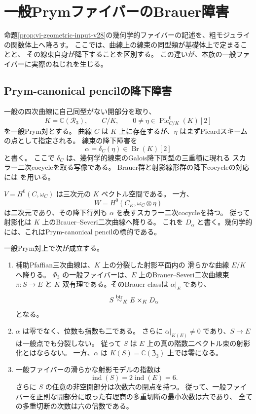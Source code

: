 \section{一般PrymファイバーのBrauer障害}
\label{sec:prym-brauer-v27}

命題\ref{prop:vi-geometric-input-v28}の幾何学的ファイバーの記述を、粗モジュライの関数体上へ降ろす。
ここでは、曲線上の線束の同型類が基礎体上で定まることと、
その線束自身が降下することを区別する。
この違いが、本族の一般ファイバーに実際のねじれを生じる。

\subsection{Prym-canonical pencilの降下障害}
一般の四次曲線に自己同型がない開部分を取り、
\[
 K=\mathbb C(\mathcal R_3),\qquad
 C/K,\qquad
 0\ne\eta\in\operatorname{Pic}^0_{C/K}(K)[2]
\]
を一般Prym対とする。
曲線 $C$ は $K$ 上に存在するが、$\eta$ はまずPicardスキームの点として指定される。
線束の降下障害を
\[
 \alpha=\delta_C(\eta)\in\operatorname{Br}(K)[2]
\]
と書く。
ここで $\delta_C$ は、幾何学的線束のGalois降下同型の三重積に現れる
スカラー二次cocycleを取る写像である。
Brauer群と射影線形群の降下cocycleの対応には
\cite[Tags 03R1, 0A2J]{StacksBrauerV27}を用いる。

$V=H^0(C,\omega_C)$ は三次元の $K$ ベクトル空間である。
一方、
\[
 W=H^0(C_{\overline K},\omega_C\otimes\eta)
\]
は二次元であり、その降下行列も $\alpha$ を表すスカラー二次cocycleを持つ。
従って射影化は $K$ 上のBrauer--Severi二次曲線へ降りる。
これを $D_\alpha$ と書く。幾何学的には、これはPrym-canonical pencilの標的である。

\begin{theorem}[一般ファイバーの非自明なねじれ]
\label{thm:prym-brauer-v27}
一般Prym対上で次が成立する。
\begin{enumerate}
\item 補助Pfaffian三次曲線は、$K$ 上の分裂した射影平面内の
滑らかな曲線 $E/K$ へ降りる。
$\Phi_3$ の一般ファイバーは、$E$ 上のBrauer--Severi二次曲線束
$\pi:S\to E$ と $K$ 双有理である。そのBrauer classは $\alpha|_E$ であり、
\[
 S\mathrel{\overset{\mathrm{bir}}{\sim}}_K E\times_KD_\alpha
\]
となる。
\item $\alpha$ は零でなく、位数も指数も二である。
さらに $\alpha|_{K(E)}\ne0$ であり、$S\to E$ は一般点でも分裂しない。
従って $S$ は $E$ 上の真の階数二ベクトル束の射影化とはならない。
一方、$\alpha$ は $K(S)=\mathbb C(\mathfrak Z_3)$ 上では零になる。
\item 一般ファイバーの滑らかな射影モデルの指数は
\[
 \operatorname{ind}(S)=2\operatorname{ind}(E)=6.
\]
さらに $S$ の任意の非空開部分は次数六の閉点を持つ。
従って、一般ファイバーを正則な開部分に取った有理商の多重切断の最小次数は六であり、
全ての多重切断の次数は六の倍数である。
\end{enumerate}
\end{theorem}

